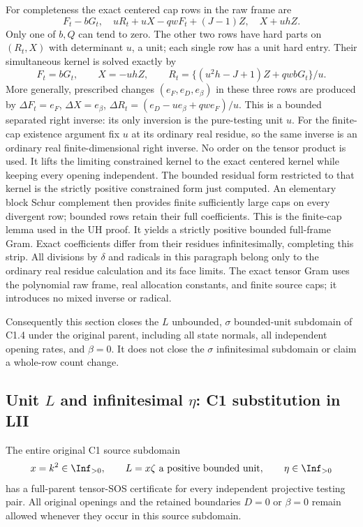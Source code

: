 For completeness the exact centered cap rows in the raw frame are
\[
 F_t-bG_t,\quad
 uR_t+uX-qwF_t+(J-1)Z,\quad X+uhZ.
\]
Only one of $b,Q$ can tend to zero. The other two rows have hard parts
on $(R_t,X)$ with determinant $u$, a unit; each single row has a unit
hard entry. Their simultaneous kernel is solved exactly by
\[
F_t=bG_t,\qquad X=-uhZ,\qquad
R_t=\{(u^2h-J+1)Z+qwbG_t\}/u.
\]
More generally, prescribed changes $(e_F,e_D,e_\beta)$ in these three
rows are produced by
$\Delta F_t=e_F$, $\Delta X=e_\beta$,
$\Delta R_t=(e_D-u e_\beta+qw e_F)/u$.
This is a bounded separated right inverse: its only inversion is the
pure-testing unit $u$. For the finite-cap existence argument fix $u$
at its ordinary real residue, so the same inverse is an ordinary real
finite-dimensional right inverse. No order on the tensor product is
used. It lifts the limiting constrained kernel to the exact centered
kernel while keeping every opening independent. The
bounded residual form restricted to that kernel is the strictly positive
constrained form just computed. An elementary block Schur complement
then provides finite sufficiently large caps on every divergent row;
bounded rows retain their full coefficients. This is the finite-cap
lemma used in the UH proof. It yields a strictly positive bounded
full-frame Gram. Exact coefficients differ from their residues
infinitesimally, completing this strip.
All divisions by $\delta$ and radicals in this paragraph belong only
to the ordinary real residue calculation and its face limits. The exact
tensor Gram uses the polynomial raw frame, real allocation constants,
and finite source caps; it introduces no mixed inverse or radical.

Consequently this section closes the $L$ unbounded, $\sigma$ bounded-unit
subdomain of C1.4 under the original parent, including all state normals,
all independent opening rates, and $\beta=0$. It does not close the
$\sigma$ infinitesimal subdomain or claim a whole-row count change.



\subsection{Unit $L$ and infinitesimal $\eta$: C1 substitution in LII}

\label{component:p080aa62de16d}

\label{p080aa62de16d:sec:r7-c1-L-unit-eta-small}

\begin{theorem}
The entire original C1 source subdomain
\[
 x=k^2\in\Inf_{>0},\qquad L=x\zeta\text{ a positive bounded unit},
 \qquad \eta\in\Inf_{>0}
\]
has a full-parent tensor-SOS certificate for every independent
projective testing pair.  All original openings and the retained
boundaries $D=0$ or $\beta=0$ remain allowed whenever they occur
in this source subdomain.
\end{theorem}

